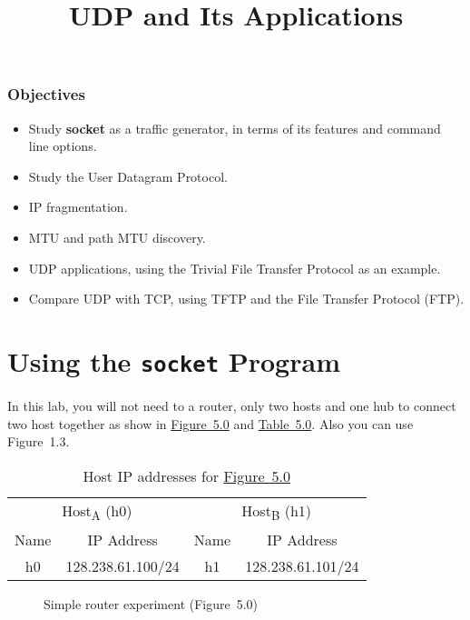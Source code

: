 \documentclass{../UTNetLab}
\title{UDP and Its Applications}
\begin{document}
\section*{Objectives}
\begin{itemize}
    \item Study \textbf{socket} as a traffic generator, in terms of its features and command line options.
    \item Study the User Datagram Protocol.
    \item IP fragmentation.
    \item MTU and path MTU discovery.
    \item UDP applications, using the Trivial File Transfer Protocol as an example.
    \item Compare UDP with TCP, using TFTP and the File Transfer Protocol (FTP).
\end{itemize}

\part{Using the \texttt{socket} Program}
\label{sec:schema}
In this lab, you will not need to a router, only two hosts and one hub to connect two host together as show in \hyperref[fig:5.0]{Figure~5.0} and \hyperref[tab:5.0]{Table~5.0}.
Also you can use Figure~1.3.
\begin{table}[H]
    \caption{Host IP addresses for \hyperref[fig:5.0]{Figure~5.0}}
    \label{tab:5.0}
    \centering
    \begin{tabular}{ *2c|*2c }
        \hline \hline
        \multicolumn{2}{c|}{Host\textsubscript{A} (h0)} & \multicolumn{2}{c}{Host\textsubscript{B} (h1)}                            \\
        Name                                            & IP Address                                     & Name & IP Address        \\
        \hline
        h0                                              & 128.238.61.100/24                              & h1   & 128.238.61.101/24 \\
        \hline \hline
    \end{tabular}
\end{table}

\begin{figure}[H]
    \centering
    \caption{Simple router experiment (Figure~5.0)}
    \label{fig:5.0}
\end{figure}
\end{document}
